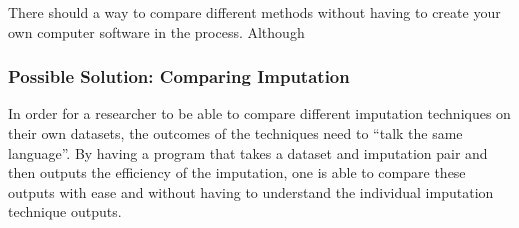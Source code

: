 \documentclass{IEEEconf}
\begin{document}
			There should a way to compare different methods without having to create your own computer software in the process. Although 
			\subsubsection{Possible Solution: Comparing Imputation} %
			\label{sub:possible_solution}
				In order for a researcher to be able to compare different imputation techniques on their own datasets, the outcomes of the techniques need to ``talk the same language''. By having a program that takes a dataset and imputation pair and then outputs the efficiency of the imputation, one is able to compare these outputs with ease and without having to understand the individual imputation technique outputs. 

 
\end{document}
